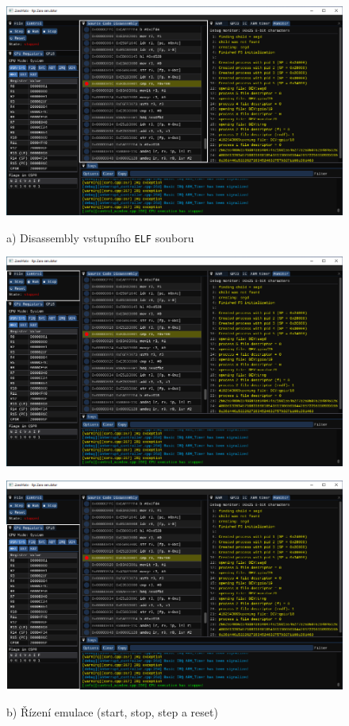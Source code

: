 \documentclass[compress]{beamer}
\begin{document}
\begin{frame}
	\centering \Large
	\begin{overlayarea}{\textwidth}{\textheight}
		\begin{figure}
			\centering
			{%
				\includegraphics[width=.85\textwidth]{img/gui/01.pdf}%
				\vspace{-0.4cm}
				\caption{a) Disassembly vstupního \texttt{ELF} souboru}
			}%
			{%
				\includegraphics[width=.85\textwidth]{img/gui/02.pdf}%
				\vspace{-0.4cm}
				\caption{b) Řízení emulace (start, stop, step a reset)}
			}%
			{%
				\includegraphics[width=.85\textwidth]{img/gui/03.pdf}%
}
\end{figure}
\end{overlayarea}
\end{frame}
\end{document}
